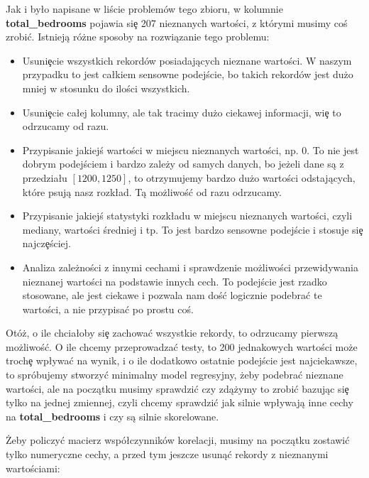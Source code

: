 \documentclass{article}
\begin{document}
\noindent
\quad Jak i by\l o napisane w liście problemów tego zbioru, w kolumnie \textbf{total\_bedrooms} pojawia si\c e 207 nieznanych wartości, z którymi musimy coś zrobi\' c. Istnieją różne sposoby na rozwiązanie tego problemu:

\begin{itemize}
  \item Usuni\c ecie wszystkich rekordów posiadających nieznane wartości. W naszym przypadku to jest ca\l kiem sensowne podejście, bo takich rekordów jest dużo mniej w stosunku do ilości wszystkich.
  \item Usuni\c ecie ca\l ej kolumny, ale tak tracimy dużo ciekawej informacji, wi\c e to odrzucamy od razu.
  \item Przypisanie jakiejś wartości w miejscu nieznanych wartości, np. 0. To nie jest dobrym podejściem i bardzo zależy od samych danych, bo jeżeli dane są z przedzia\l u $[1200, 1250]$, to otrzymujemy bardzo dużo wartości odstających, które psują nasz rozk\l ad. Tą możliwoś\'c od razu odrzucamy.
  \item Przypisanie jakiejś statystyki rozk\l adu w miejscu nieznanych wartości, czyli mediany, wartości średniej i tp. To jest bardzo sensowne podejście i stosuje si\c e najcz\c eściej.
  \item Analiza zależności z innymi cechami i sprawdzenie możliwości przewidywania nieznanej wartości na podstawie innych cech. To podejście jest rzadko stosowane, ale jest ciekawe i pozwala nam doś\'c logicznie podebra\'c te wartości, a nie przypisa\'c po prostu coś.
\end{itemize}

\noindent
\quad Otóż, o ile chcia\l oby si\c e zachowa\'c wszystkie rekordy, to odrzucamy pierwszą możliwoś\'c. O ile chcemy przeprowadza\'c testy, to 200 jednakowych wartości może troch\c e wp\l ywa\'c na wynik, i o ile dodatkowo ostatnie podejście jest najciekawsze, to spróbujemy stworzy\'c minimalny model regresyjny, żeby podebra\'c nieznane wartości, ale na początku musimy sprawdzi\'c czy zdążymy to zrobi\'c bazując si\c e tylko na jednej zmiennej, czyli chcemy sprawdzi\'c jak silnie wp\l ywają inne cechy na \textbf{total\_bedrooms} i czy są silnie skorelowane.

\noindent
\quad Żeby policzy\'c macierz wspó\l czynników korelacji, musimy na początku zostawi\'c tylko numeryczne cechy, a przed tym jeszcze usuną\'c rekordy z nieznanymi wartościami:
\end{document}
